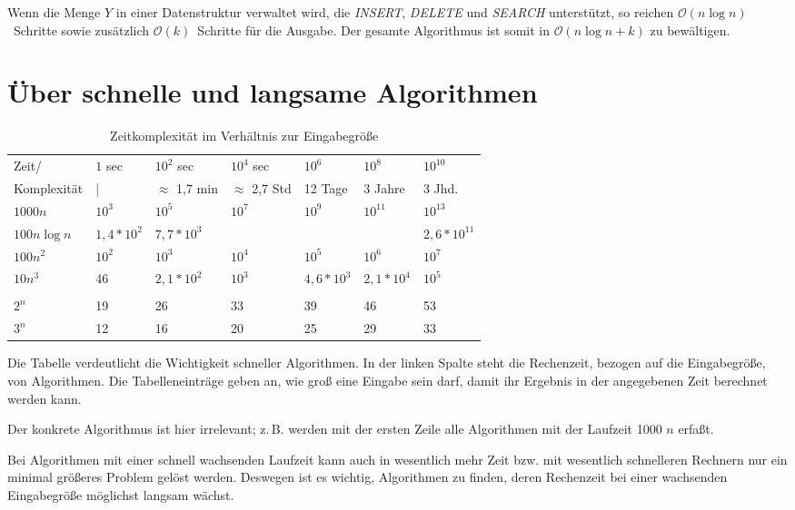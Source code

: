 \documentclass[ngerman,draft,parskip=half*,twoside]{scrreprt}
\theoremstyle{break}
\theoremstyle{nonumberbreak}
\newcommand*{\OO}{\mathcal{O}}      %
\begin{document}
Wenn die Menge $Y$ in einer Datenstruktur verwaltet wird, die
\textit{INSERT}, \textit{DELETE} und \textit{SEARCH} unterstützt, so
reichen $\OO(n \log n)$~Schritte sowie zusätzlich $\OO(k)$~Schritte für
die Ausgabe. Der gesamte Algorithmus ist somit in $\OO(n\log n+k)$ zu
bewältigen.

\section{Über schnelle und langsame Algorithmen}
\begin{table}[h]
  \begin{tabular}{*{7}{|l}|}
    \hline
    Zeit/ & $1$ sec & $10^2$ sec & $10^4$ sec & $10^6$ & $10^8$ & $10^{10}$ \\
    Komplexität & | & $\approx$ 1,7 min & $\approx$ 2,7 Std & 12 Tage & 3 Jahre & 3 Jhd.\\
    \hline
    $1000n$ & $10^3$ & $10^5$ & $10^7$ & $10^9$ & $10^{11}$ & $10^{13}$ \\
    $100n\log n$ & $1,4*10^2$ & $7,7*10^3$ & & & & $2,6*10^{11}$ \\
    $100n^2$ & $10^2$ & $10^3$ & $10^4$ & $10^5$ & $10^6$ & $10^7$\\
    $10n^3$ & 46 & $2,1*10^2$ & $10^3$ & $4,6*10^3$ & $2,1*10^4$ & $10^5$ \\
    \\
    $2^n$ & 19 & 26 & 33 & 39 & 46 & 53\\
    $3^n$ & 12 & 16 & 20 & 25 & 29 & 33\\
    \hline
  \end{tabular}
  \caption{Zeitkomplexität im Verhältnis zur Eingabegröße}
\end{table}

Die Tabelle verdeutlicht die Wichtigkeit schneller Algorithmen. 
In der linken Spalte steht die Rechenzeit, bezogen auf die Eingabegröße, von Algorithmen. 
Die Tabelleneinträge geben an, wie groß eine Eingabe sein darf, damit ihr Ergebnis in der angegebenen Zeit berechnet werden kann. 

Der konkrete Algorithmus ist hier irrelevant; z.\,B. werden mit der ersten Zeile alle Algorithmen mit der Laufzeit 1000 $n$ erfaßt. 

Bei Algorithmen mit einer schnell wachsenden Laufzeit kann auch in wesentlich mehr Zeit bzw. mit wesentlich schnelleren Rechnern nur ein
minimal größeres Problem gelöst werden. Deswegen ist es wichtig, Algorithmen zu finden, deren Rechenzeit bei einer wachsenden
Eingabegröße möglichst langsam wächst.
\end{document}
